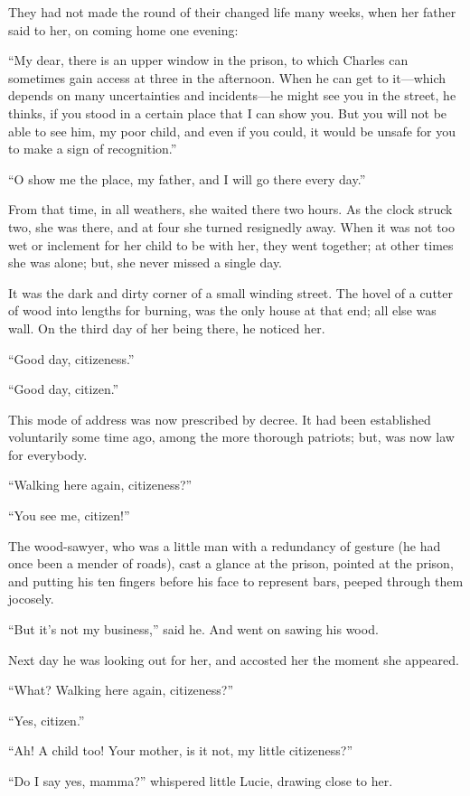 They had not made the round of their changed life many weeks,
when her father said to her, on coming home one evening:

``My dear, there is an upper window in the prison, to which Charles
can sometimes gain access at three in the afternoon.  When he can get
to it---which depends on many uncertainties and incidents---he might
see you in the street, he thinks, if you stood in a certain place
that I can show you.  But you will not be able to see him, my poor
child, and even if you could, it would be unsafe for you to make a
sign of recognition.''

``O show me the place, my father, and I will go there every day.''

From that time, in all weathers, she waited there two hours.
As the clock struck two, she was there, and at four she turned
resignedly away. When it was not too wet or inclement for her child
to be with her, they went together; at other times she was alone;
but, she never missed a single day.

It was the dark and dirty corner of a small winding street.
The hovel of a cutter of wood into lengths for burning, was the only
house at that end; all else was wall.  On the third day of her being
there, he noticed her.

``Good day, citizeness.''

``Good day, citizen.''

This mode of address was now prescribed by decree.  It had been
established voluntarily some time ago, among the more thorough
patriots; but, was now law for everybody.

``Walking here again, citizeness?''

``You see me, citizen!''

The wood-sawyer, who was a little man with a redundancy of gesture
(he had once been a mender of roads), cast a glance at the prison,
pointed at the prison, and putting his ten fingers before his face to
represent bars, peeped through them jocosely.

``But it's not my business,'' said he.  And went on sawing his wood.

Next day he was looking out for her, and accosted her the moment she
appeared.

``What?  Walking here again, citizeness?''

``Yes, citizen.''

``Ah!  A child too!  Your mother, is it not, my little citizeness?''

``Do I say yes, mamma?'' whispered little Lucie, drawing close to her.

